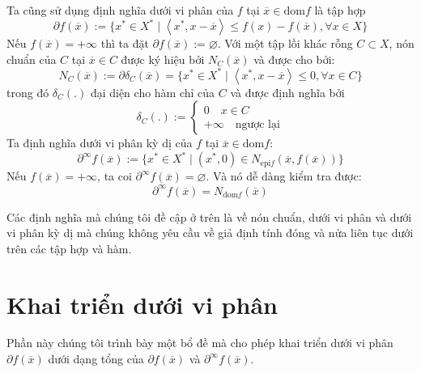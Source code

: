 Ta cũng sử dụng định nghĩa dưới vi phân của $f$ tại $\overline{x} \in \text{dom}f$ là tập hợp
\begin{equation}
    \partial f(\overline{x}) := \{x^* \in X^* \mid \left \langle x^*, x - \overline{x} \right \rangle \leq f(x) - f(\overline{x}), \forall x \in X\}
\end{equation}
Nếu $f(\overline{x}) = + \infty$ thì ta đặt $\partial f(\overline{x}) := \varnothing$. Với một tập lồi khác rỗng $C \subset X$, nón chuẩn của $C$ tại $\overline{x} \in C$ được ký hiệu bởi $N_C(\overline{x})$ và được cho bởi:
\begin{equation}
    N_C(\overline{x}) := \partial \delta_C(\overline{x}) = \{x^* \in X^* \mid \left \langle x^*, x - \overline{x} \right \rangle \leq 0, \forall x \in C\}
\end{equation}
trong đó $\delta_C(.)$ đại diện cho hàm chỉ của $C$ và được định nghĩa bởi
\begin{equation}
    \delta_C(.) := \begin{cases}
        0\quad x \in C\\
        +\infty\quad \text{ngược lại}
    \end{cases}
\end{equation}
Ta định nghĩa dưới vi phân kỳ dị của $f$ tại $\overline{x} \in \text{dom} f$:
\begin{equation}
    \partial^{\infty}f(\overline{x}) := \{x^* \in X^* \mid (x^*, 0) \in N_{\text{epi}f}(\overline{x}, f(\overline{x}))\}
\end{equation}
Nếu $f(\overline{x}) = +\infty$, ta coi $\partial^{\infty}f(\overline{x}) = \varnothing$. Và nó dễ dàng kiểm tra được:
\begin{equation}
    \partial^{\infty}f(\overline{x}) = N_{\text{dom}f}(\overline{x})
\end{equation}

Các định nghĩa mà chúng tôi đề cập ở trên là về nón chuẩn, dưới vi phân và dưới vi phân kỳ dị mà chúng không yêu cầu về giả định tính đóng và nửa liên tục dưới trên các tập hợp và hàm.

\section{Khai triển dưới vi phân}

Phần này chúng tôi trình bày một bổ đề mà cho phép khai triển dưới vi phân $\partial f(\overline{x})$ dưới dạng tổng của $\partial f(\overline{x})$ và $\partial^{\infty}f(\overline{x})$.

